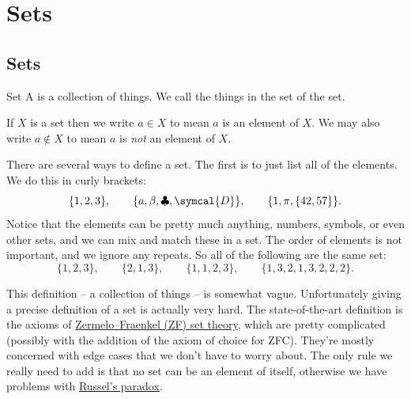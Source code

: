 \documentclass[fleqn]{LectureClass/LectureClass}
\begin{document}
    \chapter{Sets}
    \section{Sets}
    \begin{dfn}{Set}{}
        A  is a collection of things.
        We call the things in the set  of the set.
    \end{dfn}
    
    \begin{ntn}{}{}
        If \(X\) is a set then we write \(a \in X\) to mean \(a\) is an element of \(X\).
        We may also write \(a \notin X\) to mean \(a\) is \emph{not} an element of \(X\).
    \end{ntn}
    
    There are several ways to define a set.
    The first is to just list all of the elements.
    We do this in curly brackets:
    \begin{equation}
        \{1, 2, 3\}, \qquad \{a, \beta, \clubsuit, \symcal{D}\}, \qquad \{1, \pi, \{42, 57\}\}.
    \end{equation}
    Notice that the elements can be pretty much anything, numbers, symbols, or even other sets, and we can mix and match these in a set.
    The order of elements is not important, and we ignore any repeats.
    So all of the following are the same set:
    \begin{equation}
        \{1, 2, 3\}, \qquad \{2, 1, 3\}, \qquad \{1, 1, 2, 3\}, \qquad \{1, 3, 2, 1, 3, 2, 2, 2\}.
    \end{equation}
    
    \begin{remark}{}{}
        This definition -- a collection of things -- is somewhat vague.
        Unfortunately giving a precise definition of a set is actually very hard.
        The state-of-the-art definition is the axioms of \href{https://en.wikipedia.org/wiki/Zermelo%E2%80%93Fraenkel_set_theory}{Zermelo--Fraenkel (ZF) set theory}, which are pretty complicated (possibly with the addition of the axiom of choice for ZFC).
        They're mostly concerned with edge cases that we don't have to worry about.
        The only rule we really need to add is that no set can be an element of itself, otherwise we have problems with \href{https://en.wikipedia.org/wiki/Russell%27s_paradox}{Russel's paradox}.
    \end{remark}
    
\end{document}
